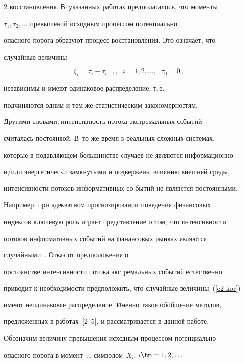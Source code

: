 \begin{multicols}{2}
восстановления. В~указанных работах предполагалось, что моменты


$\tau_1,\tau_2,\ldots$ превышений исходным процессом потенциально


опасного порога образуют процесс восстановления. Это означает, что


случайные величины


\begin{equation}


\zeta_i=\tau_i-\tau_{i-1},\ \ \ i=1,2,\ldots, \ \ \


\tau_0=0\,,\label{e2-kor}


\end{equation} 


независимы и имеют одинаковое распределение, т.\,е.\ 


подчиняются одним и тем же статистическим закономерностям.


Другими словами, интенсивность потока экстремальных событий


считалась постоянной. В~то же время в реальных сложных системах,


которые в подавляющем большинстве случаев не являются информационно


и/или энергетически замкнутыми и подвержены влиянию внешней среды,


интенсивности потоков информативных со-\linebreak бытий не являются постоянными.


Например, при адекватном прогнозировании поведения фи\-нан\-совых


индексов ключевую роль играет пред\-став\-ление о том, что интенсивности


потоков ин\-формативных событий на финансовых рынках являются


случайными~\cite{Korolevetal2013}. Отказ от предположения о


постоянстве интенсивности потока экстремальных событий естественно


приводит к необходимости предположить, что случайные величины~(\ref{e2-kor})


имеют неодинаковое распределение. Именно такое обобщение методов,


предложенных в работах~[2--5], и рассматривается в данной работе.





Обозначим величину превышения исходным процессом потенциально


опасного порога в момент~$\tau_i$ символом~$X_i$, $i\hm=1,2,\ldots$



\end{multicols}
